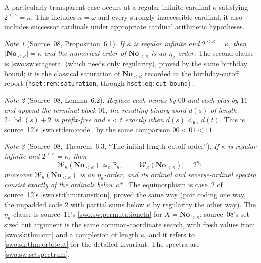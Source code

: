 \documentclass[11pt]{article}
\theoremstyle{definition}
\theoremstyle{remark}
\newtheorem{note}[note]{Note}
\newcommand{\No}{\mathbf{No}}
\newcommand{\W}{\mathcal W}
\newcommand{\B}{\mathbb B}
\newcommand{\lex}{\mathrm{lex}}
\newcommand{\bd}{\operatorname{bd}}
\newcommand{\equi}{\mathrel{\simeq_{\!e}}}
\newcommand{\card}[1]{\lvert #1\rvert}
\newcommand{\code}[1]{\texttt{\small #1}}
\begin{document}
A particularly transparent case occurs at a regular infinite cardinal
$\kappa$ satisfying $2^{<\kappa}=\kappa$. This includes $\kappa=\omega$
and every strongly inaccessible cardinal; it also includes successor
cardinals under appropriate cardinal arithmetic hypotheses.


\begin{note}[Source~08, Proposition~6.1]\label{swo:sk:prop:cutoffeta}
\emph{If $\kappa$ is regular infinite and $2^{<\kappa}=\kappa$, then
$\card{\No_{<\kappa}}=\kappa$ and the numerical order of $\No_{<\kappa}$ is an
$\eta_\kappa$-order.} The second clause is \cref{swo:sw:stageeta} (which needs
only regularity), proved by the same birthday bound; it is the classical
saturation of $\No_{<\kappa}$ recorded in the birthday-cutoff report
(\code{hset:rem:saturation}, through \code{hset:eq:cut-bound})
\cite{ProveItHset}.
\end{note}

\begin{note}[Source~08, Lemma~6.2]\label{swo:sk:lem:terminalcode}
\emph{Replace each minus by $00$ and each plus by $11$ and append the terminal
block $01$; the resulting binary word $d(s)$ of length $2\cdot\bd(s)+2$ is
prefix-free and $s<t$ exactly when $d(s)<_\lex d(t)$.} This is source~12's
\cref{swo:st:lem:code}, by the same comparison $00<01<11$.
\end{note}

\begin{note}[Source~08, Theorem~6.3, ``The initial-length cutoff order'']\label{swo:sk:thm:cutoff}
\emph{If $\kappa$ is regular infinite and $2^{<\kappa}=\kappa$, then}
\[
 \W_\kappa(\No_{<\kappa})\equi\B_\kappa,
 \qquad \card{\W_\kappa(\No_{<\kappa})}=2^\kappa;
 \tag{S08.6}\label{swo:sk:eq:t6}
\]
\emph{moreover $\W_\kappa(\No_{<\kappa})$ is an $\eta_\kappa$-order, and its
ordinal and reverse-ordinal spectra consist exactly of the ordinals below
$\kappa^+$.} The equimorphism is case~2 of source~12's
\cref{swo:st:thm:transition}, proved the same way (pair coding one way, the
unpadded code \cref{swo:sk:lem:terminalcode} with partial sums below $\kappa$
by regularity the other way). The $\eta_\kappa$ clause is source~11's
\cref{swo:sw:permutationeta} for $X=\No_{<\kappa}$; source~08's set-sized cut
argument is the same common-coordinate search, with fresh values from
\cref{swo:sk:thm:cut} and a completion of length $\kappa$, and it refers to
\cref{swo:sk:thm:orbitcut} for the detailed invariant. The spectra are
\cref{swo:sw:setspectrum}.
\end{note}
\end{document}
